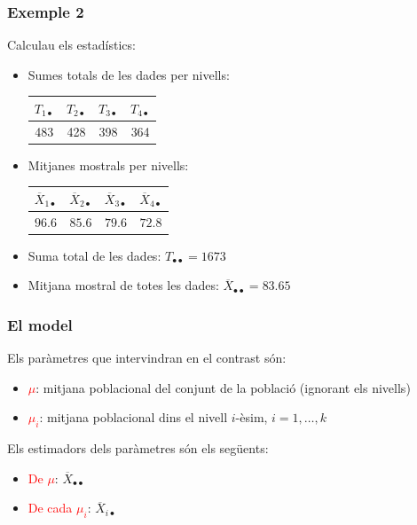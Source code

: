 \documentclass[12pt,t]{beamer}
\newcommand{\red}[1]{\textcolor{red}{#1}}
\theoremstyle{plain}
\theoremstyle{definition}
\begin{document}
\begin{frame}
\frametitle{Exemple 2}
Calculau els estadístics:
\begin{itemize}
\item Sumes totals de les dades per nivells:
\begin{center}
\begin{tabular}{c|c|c|c}
\quad${T_{1\bullet}}$\quad{} & \quad${T_{2\bullet}}$\quad{} & \quad${T_{3\bullet}}$\quad{} & \quad${T_{4\bullet}}$\quad{} \\
\hline
483 &
428 &
398 &
364
\end{tabular}
\end{center}
\medskip

\item Mitjanes mostrals per nivells:
\begin{center}
\begin{tabular}{c|c|c|c}
\quad${\overline{X}_{1\bullet}}$\quad{} & \quad${\overline{X}_{2\bullet}}$\quad{} & \quad${\overline{X}_{3\bullet}}$\quad{} & \quad${\overline{X}_{4\bullet}}$\quad{} \\
\hline
$96.6$ &
$85.6$ &
$79.6$ &
$72.8$ 
\end{tabular}
\end{center}
\medskip

\item Suma total de les dades: $T_{\bullet\bullet}=1673$
\medskip



\item Mitjana mostral de totes les dades: $\overline{X}_{\bullet\bullet}=83.65$

\end{itemize}

\end{frame}


\begin{frame}
\frametitle{El model}
Els paràmetres que intervindran en el contrast són:
\begin{itemize}
\item \red{$\mu$}: mitjana poblacional  del conjunt de la població  (ignorant els nivells)
\medskip

\item \red{$\mu_i$}: mitjana poblacional dins el nivell $i$-èsim,
$i=1,\ldots,k$
\medskip
\end{itemize}
\medskip

Els estimadors dels paràmetres són els següents:
\begin{itemize}
\item \red{De $\mu$}: $\overline{X}_{\bullet\bullet}$
\medskip

\item \red{De cada $\mu_i$}: $\overline{X}_{i\bullet}$
\end{itemize}

\end{frame}
\end{document}
